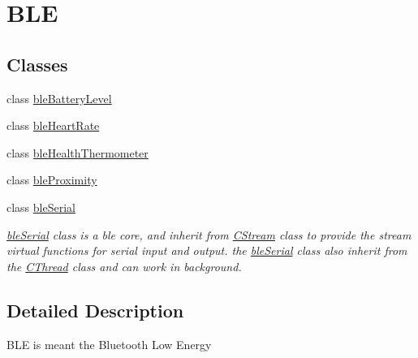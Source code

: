 \hypertarget{group___b_l_e}{\section{B\-L\-E}
\label{group___b_l_e}
}
\subsection*{Classes}
\begin{DoxyCompactItemize}
\item 
class \hyperlink{classble_battery_level}{ble\-Battery\-Level}
\item 
class \hyperlink{classble_heart_rate}{ble\-Heart\-Rate}
\item 
class \hyperlink{classble_health_thermometer}{ble\-Health\-Thermometer}
\item 
class \hyperlink{classble_proximity}{ble\-Proximity}
\item 
class \hyperlink{classble_serial}{ble\-Serial}
\begin{DoxyCompactList}\small\item\em \hyperlink{classble_serial}{ble\-Serial} class is a ble core, and inherit from \hyperlink{class_c_stream}{C\-Stream} class to provide the stream virtual functions for serial input and output. the \hyperlink{classble_serial}{ble\-Serial} class also inherit from the \hyperlink{class_c_thread}{C\-Thread} class and can work in background. \end{DoxyCompactList}\end{DoxyCompactItemize}


\subsection{Detailed Description}
B\-L\-E is meant the Bluetooth Low Energy 